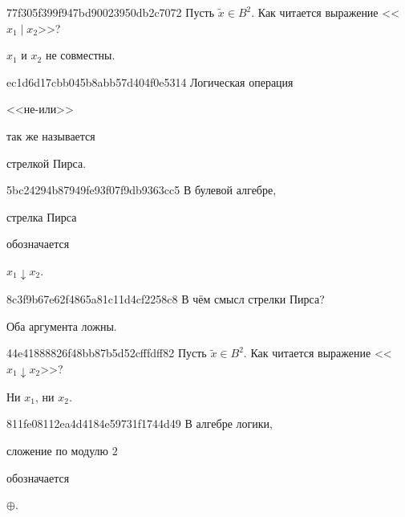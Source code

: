 \begin{note}{77f305f399f947bd90023950db2c7072}
    Пусть \({ \widetilde x \in B^2 }\).
    Как читается выражение <<\({ x_1 \mid x_2 }\)>>?

    \begin{cloze}{1}
        \({ x_1 }\) и \({ x_2 }\) не совместны.
    \end{cloze}
\end{note}

\begin{note}{ec1d6d17cbb045b8abb57d404f0e5314}
    Логическая операция \begin{icloze}{2}<<не-или>>\end{icloze} так же называется \begin{icloze}{1}стрелкой Пирса.\end{icloze}
\end{note}

\begin{note}{5bc24294b87949fe93f07f9db9363cc5}
    В булевой алгебре, \begin{icloze}{2}стрелка Пирса\end{icloze} обозначается \begin{icloze}{1}\({ x_1 \downarrow x_2 }\).\end{icloze}
\end{note}

\begin{note}{8c3f9b67e62f4865a81c11d4cf2258c8}
    В чём смысл стрелки Пирса?

    \begin{cloze}{1}
        Оба аргумента ложны.
    \end{cloze}
\end{note}

\begin{note}{44e41888826f48bb87b5d52cfffdff82}
    Пусть \({ \widetilde x \in B^2 }\).
    Как читается выражение <<\({ x_1 \downarrow x_2 }\)>>?

    \begin{cloze}{1}
        Ни \({ x_1 }\), ни \({ x_2 }\).
    \end{cloze}
\end{note}

\begin{note}{811fe08112ea4d4184e59731f1744d49}
    В алгебре логики, \begin{icloze}{2}сложение по модулю \({ 2 }\)\end{icloze} обозначается \begin{icloze}{1}\({ \oplus }\).\end{icloze}
\end{note}

